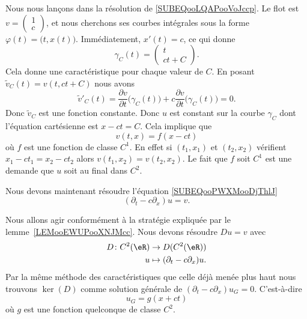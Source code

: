 Nous nous lançons dans la résolution de \eqref{SUBEQooLQAPooVoJccp}. Le flot est \( v=\begin{pmatrix}
    1    \\
    c
\end{pmatrix}\), et nous cherchons ses courbes intégrales sous la forme \( \varphi(t)=\big( t,x(t) \big)\). Immédiatement, \( x'(t)=c\), ce qui donne
\begin{equation}
    \gamma_C(t)=\begin{pmatrix}
        t    \\
        ct+C
    \end{pmatrix}.
\end{equation}
Cela donne une caractéristique pour chaque valeur de \( C\). En posant \( \tilde v_C(t)=v(t,ct+C)\) nous avons
\begin{equation}
    \tilde v'_C(t)=\frac{ \partial v }{ \partial t }\big( \gamma_C(t) \big)+c\frac{ \partial v }{ \partial t }\big( \gamma_C(t) \big)=0.
\end{equation}
Donc \( \tilde v_C\) est une fonction constante. Donc \( u\) est constant sur la courbe \( \gamma_C\) dont l'équation cartésienne est \( x-ct=C\). Cela implique que
\begin{equation}
    v(t,x)=f(x-ct)
\end{equation}
où \( f\) est une fonction de classe \( C^1\). En effet si \( (t_1,x_1)\) et \( (t_2,x_2)\) vérifient \( x_1-ct_1=x_2-ct_2\) alors \( v(t_1,x_2)=v(t_2,x_2)\). Le fait que \( f\) soit \( C^1\) est une demande que \( u\) soit au final dans \( C^2\).

Nous devons maintenant résoudre l'équation \eqref{SUBEQooPWXMooDjThlJ}
\begin{equation}
    (\partial_t-c\partial_x)u=v.
\end{equation}

Nous allons agir conformément à la stratégie expliquée par le lemme~\ref{LEMooEWUPooXNJMcc}. Nous devons résoudre \( Du=v\) avec
\begin{equation}
    \begin{aligned}
        D\colon C^2(\eR)&\to D(C^2(\eR)) \\
        u&\mapsto (\partial_t-c\partial_x)u.
    \end{aligned}
\end{equation}
Par la même méthode des caractéristiques que celle déjà menée plus haut nous trouvons \( \ker(D)\) comme solution générale de \( (\partial_t-c\partial_x)u_G=0\). C'est-à-dire
\begin{equation}
    u_G=g(x+ct)
\end{equation}
où \( g\) est une fonction quelconque de classe \( C^2\).

